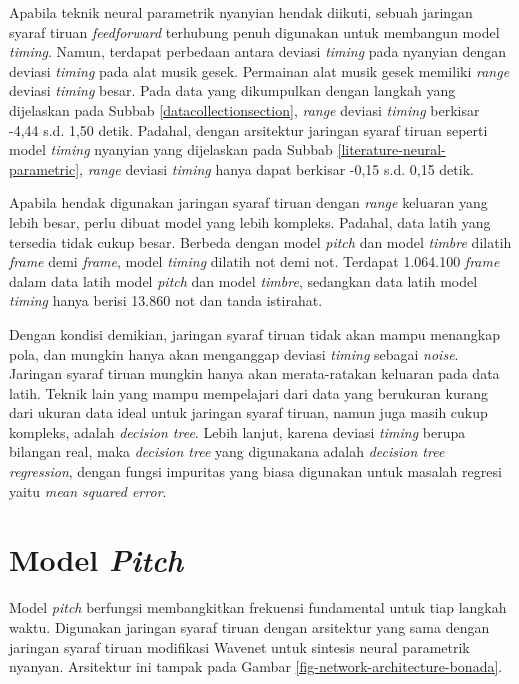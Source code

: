 Apabila teknik neural parametrik nyanyian hendak diikuti, sebuah jaringan syaraf tiruan \textit{feedforward} terhubung penuh digunakan untuk membangun model \textit{timing}. Namun, terdapat perbedaan antara deviasi \textit{timing} pada nyanyian dengan deviasi \textit{timing} pada alat musik gesek. Permainan alat musik gesek memiliki \textit{range} deviasi \textit{timing} besar. Pada data yang dikumpulkan dengan langkah yang dijelaskan pada Subbab \ref{datacollectionsection}, \textit{range} deviasi \textit{timing} berkisar -4,44 s.d. 1,50 detik. Padahal, dengan arsitektur jaringan syaraf tiruan seperti model \textit{timing} nyanyian yang dijelaskan pada Subbab \ref{literature-neural-parametric}, \textit{range} deviasi \textit{timing} hanya dapat berkisar -0,15 s.d. 0,15 detik.

Apabila hendak digunakan jaringan syaraf tiruan dengan \textit{range} keluaran yang lebih besar, perlu dibuat model yang lebih kompleks. Padahal, data latih yang tersedia tidak cukup besar. Berbeda dengan model \textit{pitch} dan model \textit{timbre} dilatih \textit{frame} demi \textit{frame}, model \textit{timing} dilatih not demi not. Terdapat  1.064.100 \textit{frame} dalam data latih model \textit{pitch} dan model \textit{timbre}, sedangkan data latih model \textit{timing} hanya berisi 13.860 not dan tanda istirahat.

Dengan kondisi demikian, jaringan syaraf tiruan tidak akan mampu menangkap pola, dan mungkin hanya akan menganggap deviasi \textit{timing} sebagai \textit{noise}. Jaringan syaraf tiruan mungkin hanya akan merata-ratakan keluaran pada data latih. Teknik lain yang mampu mempelajari dari data yang berukuran kurang dari ukuran data ideal untuk jaringan syaraf tiruan, namun juga masih cukup kompleks, adalah \textit{decision tree}. Lebih lanjut, karena deviasi \textit{timing} berupa bilangan real, maka \textit{decision tree} yang digunakana adalah \textit{decision tree regression}, dengan fungsi impuritas yang biasa digunakan untuk masalah regresi yaitu \textit{mean squared error}.

\section{Model \textit{Pitch}}

Model \textit{pitch} berfungsi membangkitkan frekuensi fundamental untuk tiap langkah waktu. Digunakan jaringan syaraf tiruan dengan arsitektur yang sama dengan jaringan syaraf tiruan modifikasi Wavenet untuk sintesis neural parametrik nyanyan. Arsitektur ini tampak pada Gambar \ref{fig-network-architecture-bonada}.


